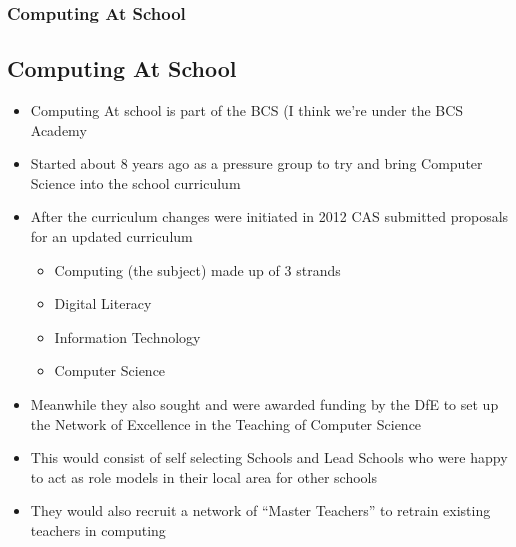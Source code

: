 \documentclass{beamer}
\begin{document}
\begin{frame}
  \frametitle{Computing At School}
  \subsection{Computing At School}

  \begin{itemize}
  \item Computing At school is part of the BCS (I think we're under the BCS Academy
  \item Started about 8 years ago as a pressure group to try and bring Computer Science into the school curriculum
  \item After the curriculum changes were initiated in 2012 CAS submitted proposals for an updated curriculum
    \begin{itemize}
    \item Computing (the subject) made up of 3 strands
    \item Digital Literacy
    \item Information Technology
    \item Computer Science
    \end{itemize}
  \item Meanwhile they also sought and were awarded funding by the DfE to set up the Network of Excellence in the
    Teaching of Computer Science
  \item This would consist of self selecting Schools and Lead Schools who were happy to act as role models in their
    local area for other schools
  \item They would also recruit a network of ``Master Teachers'' to retrain existing teachers in computing
  \end{itemize}
\end{frame}

 

  
\end{document}
